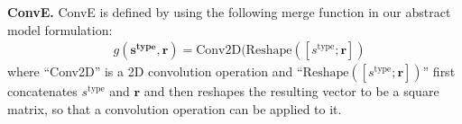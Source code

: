 \textbf{ConvE.}
ConvE is defined by using the following merge function in our abstract model formulation:
\begin{align}
    & g(\bm{s^{\textrm{type}}}, \bm{r}) = \text{Conv2D}(\text{Reshape}([s^{\textrm{type}}; \bm{r}])
\end{align}
where ``Conv2D'' is a 2D convolution operation and ``$\text{Reshape}([s^{\textrm{type}}; \bm{r}])$'' first concatenates $s^{\textrm{type}}$ and $\bm{r}$ and then reshapes the resulting vector to be a square matrix, so that a convolution operation can be applied to it.
